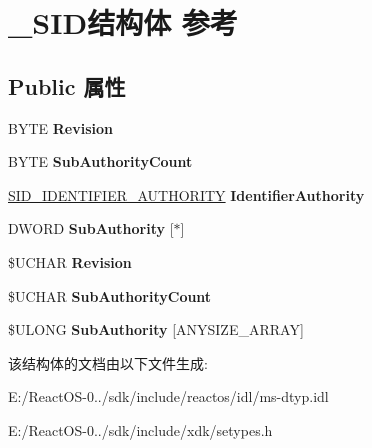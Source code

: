 \hypertarget{struct___s_i_d}{}\section{\+\_\+\+S\+I\+D结构体 参考}
\label{struct___s_i_d}
\subsection*{Public 属性}
\begin{DoxyCompactItemize}
\item 
\mbox{\label{struct___s_i_d_a1a00b2a5f2a39990099f9978bc327065}} 
B\+Y\+TE {\bfseries Revision}
\item 
\mbox{\label{struct___s_i_d_a873349656549790ed9b5676aade3c38e}} 
B\+Y\+TE {\bfseries Sub\+Authority\+Count}
\item 
\mbox{\label{struct___s_i_d_ad8ef3ca4f98f30abbadebf247214256e}} 
\hyperlink{struct___s_i_d___i_d_e_n_t_i_f_i_e_r___a_u_t_h_o_r_i_t_y}{S\+I\+D\+\_\+\+I\+D\+E\+N\+T\+I\+F\+I\+E\+R\+\_\+\+A\+U\+T\+H\+O\+R\+I\+TY} {\bfseries Identifier\+Authority}
\item 
\mbox{\label{struct___s_i_d_a635cd8969e8f3cd5b34a566a4a20fc11}} 
D\+W\+O\+RD {\bfseries Sub\+Authority} \mbox{[}$\ast$\mbox{]}
\item 
\mbox{\label{struct___s_i_d_a65fa1e0d11b6ef812c1fc63fb6dd83e3}} 
\$U\+C\+H\+AR {\bfseries Revision}
\item 
\mbox{\label{struct___s_i_d_a254ff9061c630a866011cfaf92e32ba0}} 
\$U\+C\+H\+AR {\bfseries Sub\+Authority\+Count}
\item 
\mbox{\label{struct___s_i_d_a2e4f3b894fba416954c4e6ea412bb051}} 
\$U\+L\+O\+NG {\bfseries Sub\+Authority} \mbox{[}A\+N\+Y\+S\+I\+Z\+E\+\_\+\+A\+R\+R\+AY\mbox{]}
\end{DoxyCompactItemize}


该结构体的文档由以下文件生成\+:\begin{DoxyCompactItemize}
\item 
E\+:/\+React\+O\+S-\/0../sdk/include/reactos/idl/ms-\/dtyp.\+idl\item 
E\+:/\+React\+O\+S-\/0../sdk/include/xdk/setypes.\+h\end{DoxyCompactItemize}
